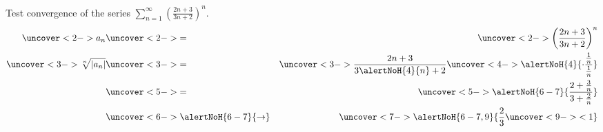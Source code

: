 \begin{frame}
\begin{example} %
Test convergence of the series $\displaystyle \sum_{n=1}^\infty \left( \frac{2n + 3}{3n+2}\right)^n$.
\abovedisplayskip=0pt
\belowdisplayskip=0pt
\begin{eqnarray*}
\uncover<2->{%
a_n %
}%
 & \uncover<2->{=} & %
\uncover<2->{%
\left( \frac{2n+3}{3n+2}\right)^n%
}\\%
\uncover<3->{%
\sqrt[n]{\left| a_n\right|} %
}%
 & \uncover<3->{=} & %
\uncover<3->{%
\frac{2n+3}{3\alertNoH{ 4}{n}+2}\uncover<4->{\alertNoH{ 4}{\cdot \frac{\frac{1}{n}}{\frac{1}{n}}}}%
}\\%
 & \uncover<5->{=} & %
\uncover<5->{%
\alertNoH{ 6-7}{%
\frac{2 + \frac{3}{n}}{3+\frac{2}{n}}%
}%
}\\%
 & \uncover<6->{\alertNoH{ 6-7}{\to}} & %
\uncover<7->{%
\alertNoH{ 6-7,9}{%
\frac{2}{3} \uncover<9->{ < 1 }
}%
}%
\end{eqnarray*}
%
\end{example}
\end{frame}

